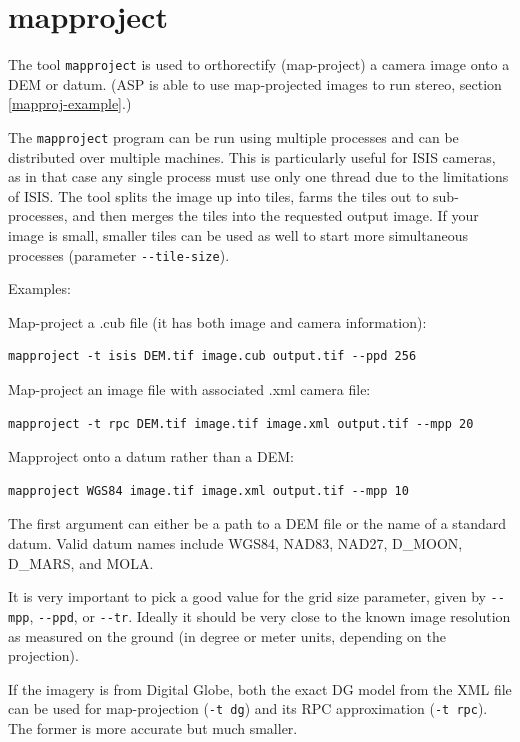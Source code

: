 \clearpage

\section{mapproject}
\label{mapproject}

The tool \texttt{mapproject} is used to orthorectify (map-project) a camera image onto
a DEM or datum. (ASP is able to use map-projected images to run stereo, section
\ref{mapproj-example}.)

The \texttt{mapproject} program can be run using multiple processes and can be
distributed over multiple machines. This is particularly useful for
ISIS cameras, as in that case any single process must use only one thread
due to the limitations of ISIS.  The tool splits the image up into tiles,
farms the tiles out to sub-processes, and then merges the tiles into the
requested output image. If your image is small, smaller tiles can be used
as well to start more simultaneous processes (parameter \texttt{-\/-tile-size}).

Examples:

Map-project a .cub file (it has both image and camera information):
\begin{verbatim}
mapproject -t isis DEM.tif image.cub output.tif --ppd 256
\end{verbatim}

Map-project an image file with associated .xml camera file:
\begin{verbatim}
mapproject -t rpc DEM.tif image.tif image.xml output.tif --mpp 20
\end{verbatim}

Mapproject onto a datum rather than a DEM:
\begin{verbatim}
mapproject WGS84 image.tif image.xml output.tif --mpp 10
\end{verbatim}

The first argument can either be a path to a DEM file or the name of a standard datum.
Valid datum names include WGS84, NAD83, NAD27, D\_MOON, D\_MARS, and MOLA.

It is very important to pick a good value for the grid size parameter, given by
\texttt{-\/-mpp}, \texttt{-\/-ppd}, or \texttt{-\/-tr}. Ideally it should be very close to the known image resolution
as measured on the ground (in degree or meter units, depending on the projection).

If the imagery is from Digital Globe, both the exact DG model from the XML file
can be used for map-projection (\texttt{-t dg}) and its RPC approximation (\texttt{-t rpc}).
The former is more accurate but much smaller.

